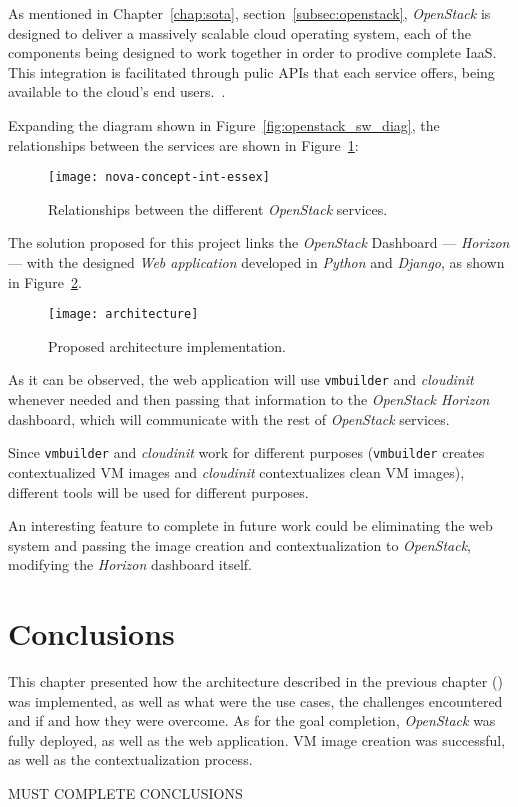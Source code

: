 As mentioned in Chapter~\ref{chap:sota}, section~\ref{subsec:openstack}, \textit{OpenStack} is designed to deliver a massively scalable cloud operating system, each of the components being designed to work together in order to prodive complete IaaS. This integration is facilitated through pulic APIs that each service offers, being available to the cloud's end users.~\cite{ken-pepple:essex-arch}. 

Expanding the diagram shown in Figure~\ref{fig:openstack_sw_diag}, the relationships between the services are shown in Figure~\ref{fig:openstack_services}:

\begin{figure}[h!]
  \begin{center}
    \leavevmode
    \texttt{[image: nova-concept-int-essex]}
    \caption{Relationships between the different \textit{OpenStack} services.~\cite{ken-pepple:essex-arch}}
    \label{fig:openstack_services}
  \end{center}
\end{figure}

The solution proposed for this project links the \textit{OpenStack} Dashboard --- \textit{Horizon} --- with the designed \textit{Web application} developed in \textit{Python} and \textit{Django}, as shown in Figure~\ref{fig:architecture}.

\begin{figure}[t]
  \begin{center}
    \leavevmode
    \texttt{[image: architecture]}
    \caption{Proposed architecture implementation.}
    \label{fig:architecture}
  \end{center}
\end{figure}

As it can be observed, the web application will use \texttt{vmbuilder} and \textit{cloudinit} whenever needed and then passing that information to the \textit{OpenStack Horizon} dashboard, which will communicate with the rest of \textit{OpenStack} services.

Since \texttt{vmbuilder} and \textit{cloudinit} work for different purposes (\texttt{vmbuilder} creates contextualized VM images and \textit{cloudinit} contextualizes clean VM images), different tools will be used for different purposes.



An interesting feature to complete in future work could be eliminating the web system and passing the image creation and contextualization to \textit{OpenStack}, modifying the \textit{Horizon} dashboard itself.
 

\section{Conclusions}

This chapter presented how the architecture described in the previous chapter () was implemented, as well as what were the use cases, the challenges encountered and if and how they were overcome. 
As for the goal completion, \textit{OpenStack} was fully deployed, as well as the web application. VM image creation was successful, as well as the contextualization process.


MUST COMPLETE CONCLUSIONS
